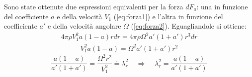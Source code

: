 Sono state ottenute due espressioni equivalenti per la forza $dF_a$: una in funzione del coefficiente $a$ e della velocità $V_1$ (\ref{eq:forza1}) e l'altra in funzione del coefficiente $a'$ e della velocità angolare $\Omega$ (\ref{eq:forza2}). Eguagliandole si ottiene:
\begin{align*}
4 \pi \rho V_1^2 a \left( 1 - a \right) r dr = 4 \pi \rho \Omega^2 a' \left( 1 + a' \right) r^3 dr
\end{align*}
\begin{align*}
V_1^2 a \left( 1 - a \right) = \Omega^2 a' \left( 1 + a' \right) r^2
\end{align*}
\begin{equation}\label{eq:lambdara}
\frac{a \left( 1 - a \right)}{a' \left(1 + a' \right)} = \frac{\Omega^2 r^2}{V_1^2}\doteq \lambda_r^2 \;\;\;\; \Rightarrow \;\;\;\; \boxed{\lambda_r^2 = \frac{a \left(1 - a \right)}{a' \left( 1 + a' \right)}}
\end{equation}

